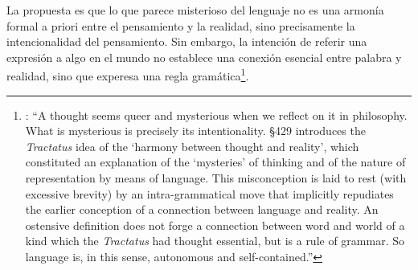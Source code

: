 La propuesta es que lo que parece misterioso del lenguaje no es una armonía formal a priori entre el pensamiento y la realidad, sino precisamente la intencionalidad del pensamiento. Sin embargo, la intención de referir una expresión a algo en el mundo no establece una conexión esencial entre palabra y realidad, sino que experesa una regla gramática\footnote{\cite[4]{hacker2000mind}: \enquote{A thought seems queer and mysterious when we reflect on it in philosophy. What is mysterious is precisely its intentionality. \S429 introduces the \emph{Tractatus} idea of the `harmony between thought and reality', which constituted an explanation of the `mysteries' of thinking and of the nature of representation by means of language. This misconception is laid to rest (with excessive brevity) by an intra-grammatical move that implicitly repudiates the earlier conception of a connection between language and reality. An ostensive definition does not forge a connection between word and world of a kind which the \emph{Tractatus} had thought essential, but is a rule of grammar. So language is, in this sense, autonomous and self-contained.}}.
